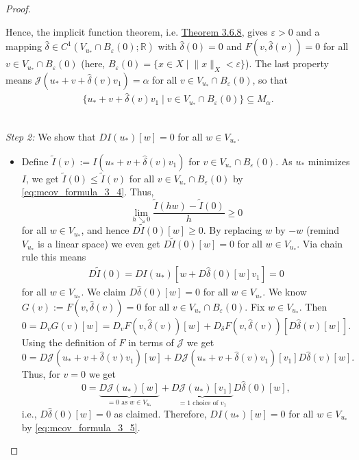 \begin{proof}
\begin{itemize}
	Hence, the implicit function theorem, i.e. \hyperlink{theorem_3_6_8}{Theorem 3.6.8}, gives $\varepsilon>0$ and a mapping $\hat{\delta}\in C^1(V_{u_*}\cap B_\varepsilon(0);\mathbb{R})$ with $\hat{\delta}(0)=0$ and $F(v,\hat{\delta}(v))=0$ for all $v\in V_{u_*}\cap B_\varepsilon(0)$ (here, $B_\varepsilon(0)=\{x\in X\mid\lVert x\rVert_X<\varepsilon\}$). The last property means $\mathcal{J}(u_*+v+\hat{\delta}(v)v_1)=\alpha$ for all $v\in V_{u_*}\cap B_\varepsilon(0)$, so that
	\begin{align}\label{eq:mcov_formula_3_4}
		\{u_*+v+\hat{\delta}(v)v_1\mid v\in V_{u_*}\cap B_\varepsilon(0)\}\subseteq M_\alpha.
	\end{align}\\
\end{itemize}

\textit{Step 2:} We show that $DI(u_*)[w]=0$ for all $w\in V_{u_*}$.
\begin{itemize}
	\item[] Define $\widetilde{I}(v):=I(u_*+v+\hat{\delta}(v)v_1)$ for $v\in V_{u_*}\cap B_\varepsilon(0)$. As $u_*$ minimizes $I$, we get $\widetilde{I}(0)\leq\widetilde{I}(v)$ for all $v\in V_{u_*}\cap B_\varepsilon(0)$ by \eqref{eq:mcov_formula_3_4}. Thus,
	\[\lim_{h\searrow0}{\frac{\widetilde{I}(hw)-\widetilde{I}(0)}{h}}\geq0\]
	for all $w\in V_{u_*}$, and hence $D\widetilde{I}(0)[w]\geq0$. By replacing $w$ by $-w$ (remind $V_{u_*}$ is a linear space) we even get $D\widetilde{I}(0)[w]=0$ for all $w\in V_{u_*}$. Via chain rule this means
	\begin{align}\label{eq:mcov_formula_3_5}
		D\widetilde{I}(0)=DI(u_*)[w+D\hat{\delta}(0)[w]v_1]=0
	\end{align}
	for all $w\in V_{u_*}$. We claim $D\hat{\delta}(0)[w]=0$ for all $w\in V_{u_*}$. We know $G(v):=F(v,\hat{\delta}(v))=0$ for all $v\in V_{u_*}\cap B_\varepsilon(0)$. Fix $w\in V_{u_*}$. Then
	\[0=D_vG(v)[w]=D_vF(v,\hat{\delta}(v))[w]+D_\delta F(v,\hat{\delta}(v))[D\hat{\delta}(v)[w]].\]
	Using the definition of $F$ in terms of $\mathcal{J}$ we get
	\[0=D\mathcal{J}(u_*+v+\hat{\delta}(v)v_1)[w]+D\mathcal{J}(u_*+v+\hat{\delta}(v)v_1)[v_1]D\hat{\delta}(v)[w].\]
	Thus, for $v=0$ we get
	\[0=\underbrace{D\mathcal{J}(u_*)[w]}_{=0\text{ as }w\in V_{u_*}}+\underbrace{D\mathcal{J}(u_*)[v_1]}_{=1\text{ choice of }v_1}D\hat{\delta}(0)[w],\]
	i.e., $D\hat{\delta}(0)[w]=0$ as claimed. Therefore, $DI(u_*)[w]=0$ for all $w\in V_{u_*}$ by \eqref{eq:mcov_formula_3_5}.\newpage
\end{itemize}


\end{proof}
